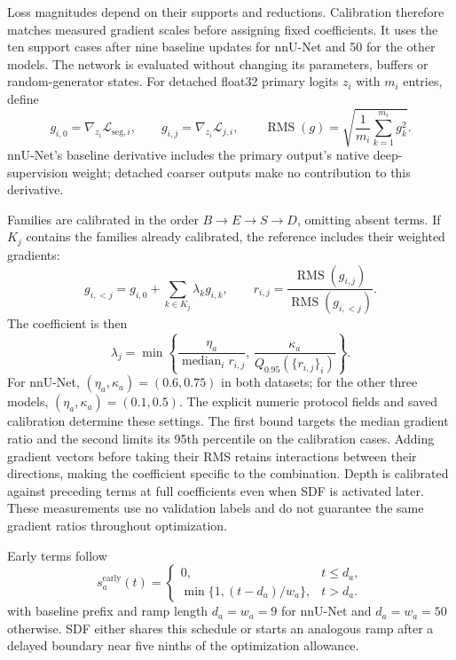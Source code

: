 \documentclass[12pt,a4paper]{article}
\begin{document}
Loss magnitudes depend on their supports and reductions. Calibration
therefore matches measured gradient scales before assigning fixed
coefficients. It uses the ten support cases after nine
baseline updates for nnU-Net and 50 for the other models. The network
is evaluated without changing its parameters, buffers or random-generator
states. For detached float32 primary logits $z_i$ with $m_i$ entries,
define
\begin{equation}
g_{i,0}=\nabla_{z_i}\mathcal{L}_{\mathrm{seg},i},
\qquad
g_{i,j}=\nabla_{z_i}\mathcal{L}_{j,i},
\qquad
\operatorname{RMS}(g)=
\sqrt{\frac{1}{m_i}\sum_{k=1}^{m_i}g_k^2}.
\label{eq:calibration-logit-gradients}
\end{equation}
nnU-Net's baseline derivative includes the primary output's native
deep-supervision weight; detached coarser outputs make no contribution
to this derivative.

Families are calibrated in the order $B\to E\to S\to D$, omitting
absent terms. If $K_j$ contains the families already calibrated, the
reference includes their weighted gradients:
\begin{equation}
g_{i,<j}=g_{i,0}+\sum_{k\in K_j}\lambda_k g_{i,k},
\qquad
r_{i,j}=\frac{\operatorname{RMS}(g_{i,j})}
                  {\operatorname{RMS}(g_{i,<j})}.
\label{eq:sequential-calibration-ratio}
\end{equation}
The coefficient is then
\begin{equation}
\lambda_j=
\min\left\{
\frac{\eta_a}{\operatorname{median}_i r_{i,j}},\,
\frac{\kappa_a}{Q_{0.95}(\{r_{i,j}\}_i)}
\right\}.
\label{eq:constraint-calibrated-coefficient}
\end{equation}
For nnU-Net, $(\eta_a,\kappa_a)=(0.6,0.75)$ in both datasets;
for the other three models, $(\eta_a,\kappa_a)=(0.1,0.5)$. The explicit
numeric protocol fields and saved calibration determine these settings.
The first bound targets the median gradient ratio and the second
limits its 95th percentile on the calibration cases. Adding gradient vectors
before taking their RMS retains interactions between their directions,
making the coefficient specific to the combination. Depth is calibrated
against preceding terms at full coefficients even when SDF is activated
later. These measurements use no validation labels and do not guarantee
the same gradient ratios throughout optimization.

Early terms follow
\begin{equation}
s_a^{\mathrm{early}}(t)=
\begin{cases}
0, & t\leq d_a,\\
\min\{1,(t-d_a)/w_a\}, & t>d_a.
\end{cases}
\label{eq:constraint-early-ramp}
\end{equation}
with baseline prefix and ramp length $d_a=w_a=9$ for nnU-Net and
$d_a=w_a=50$ otherwise. SDF either shares this schedule or starts an
analogous ramp after a delayed boundary near five ninths of the
optimization allowance.
\end{document}
